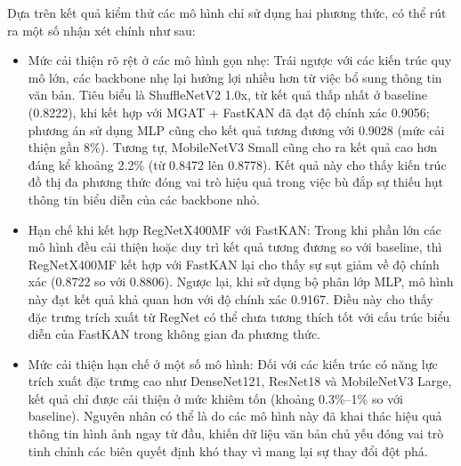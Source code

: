 \indent Dựa trên kết quả kiểm thử các mô hình chỉ sử dụng hai phương thức, có thể rút ra một số nhận xét chính như sau:\vspace{-0.1cm}
\begin{itemize}[label={--}, itemsep=1pt]
    \item Mức cải thiện rõ rệt ở các mô hình gọn nhẹ: Trái ngược với các kiến trúc quy mô lớn, các backbone nhẹ lại hưởng lợi nhiều hơn từ việc bổ sung thông tin văn bản. Tiêu biểu là ShuffleNetV2 1.0x, từ kết quả thấp nhất ở baseline (0.8222), khi kết hợp với MGAT + FastKAN đã đạt độ chính xác 0.9056; phương án sử dụng MLP cũng cho kết quả tương đương với 0.9028 (mức cải thiện gần 8\%). Tương tự, MobileNetV3 Small cũng cho ra kết quả cao hơn đáng kể khoảng 2.2\% (từ 0.8472 lên 0.8778). Kết quả này cho thấy kiến trúc đồ thị đa phương thức đóng vai trò hiệu quả trong việc bù đắp sự thiếu hụt thông tin biểu diễn của các backbone nhỏ.
    
    \item Hạn chế khi kết hợp RegNetX400MF với FastKAN: Trong khi phần lớn các mô hình đều cải thiện hoặc duy trì kết quả tương đương so với baseline, thì RegNetX400MF kết hợp với FastKAN lại cho thấy sự sụt giảm về độ chính xác (0.8722 so với 0.8806). Ngược lại, khi sử dụng bộ phân lớp MLP, mô hình này đạt kết quả khả quan hơn với độ chính xác 0.9167. Điều này cho thấy đặc trưng trích xuất từ RegNet có thể chưa tương thích tốt với cấu trúc biểu diễn của FastKAN trong không gian đa phương thức.
    
    \item Mức cải thiện hạn chế ở một số mô hình: Đối với các kiến trúc có năng lực trích xuất đặc trưng cao như DenseNet121, ResNet18 và MobileNetV3 Large, kết quả chỉ được cải thiện ở mức khiêm tốn (khoảng 0.3\%–1\% so với baseline). Nguyên nhân có thể là do các mô hình này đã khai thác hiệu quả thông tin hình ảnh ngay từ đầu, khiến dữ liệu văn bản chủ yếu đóng vai trò tinh chỉnh các biên quyết định khó thay vì mang lại sự thay đổi đột phá.
\end{itemize}


